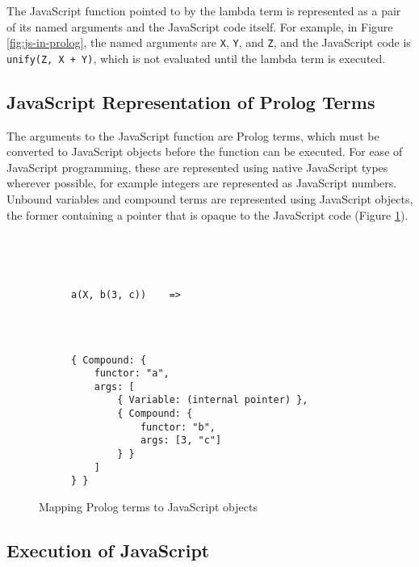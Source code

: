 The JavaScript function pointed to by the lambda term is represented as a pair of its named arguments and the JavaScript code itself. For example, in Figure \ref{fig:js-in-prolog}, the named arguments are \texttt{X}, \texttt{Y}, and \texttt{Z}, and the JavaScript code is \texttt{unify(Z, X + Y)}, which is not evaluated until the lambda term is executed.

\subsection{JavaScript Representation of Prolog Terms}

\label{sec:js-prolog-mapping}

The arguments to the JavaScript function are Prolog terms, which must be converted to JavaScript objects before the function can be executed. For ease of JavaScript programming, these are represented using native JavaScript types wherever possible, for example integers are represented as JavaScript numbers. Unbound variables and compound terms are represented using JavaScript objects, the former containing a pointer that is opaque to the JavaScript code (Figure \ref{fig:prolog-js-mapping}).

\begin{figure}[H]
\centering
\begin{subfigure}{0.3\textwidth}
\centering
\begin{verbatim}




a(X, b(3, c))    =>




\end{verbatim}
\end{subfigure}%
\begin{subfigure}{0.7\textwidth}
\centering
\begin{verbatim}
{ Compound: {
    functor: "a",
    args: [
        { Variable: (internal pointer) },
        { Compound: {
            functor: "b",
            args: [3, "c"]
        } }
    ]
} }
\end{verbatim}
\end{subfigure}
\caption{Mapping Prolog terms to JavaScript objects}
\label{fig:prolog-js-mapping}
\end{figure}

\subsection{Execution of JavaScript}

